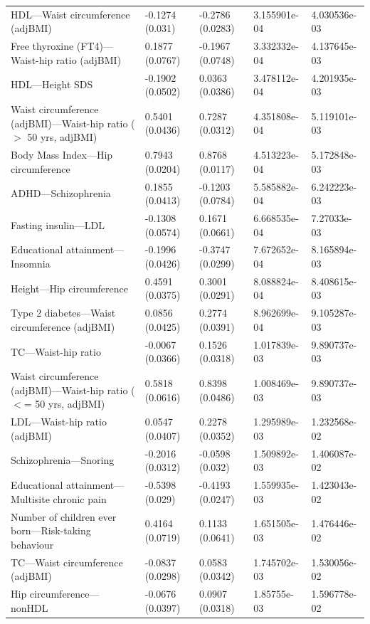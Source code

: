\documentclass{article}\usepackage[]{graphicx}\usepackage[dvipsnames]{xcolor}
\begin{document}
\begin{longtable}{p{6cm}|p{1.5cm}|p{1.5cm}|p{1.5cm}}
  HDL---Waist circumference (adjBMI) & -0.1274 (0.031) & -0.2786 (0.0283) & 3.155901e-04 & 4.030536e-03 \\ 
  Free thyroxine (FT4)---Waist-hip ratio (adjBMI) & 0.1877 (0.0767) & -0.1967 (0.0748) & 3.332332e-04 & 4.137645e-03 \\ 
  HDL---Height SDS & -0.1902 (0.0502) & 0.0363 (0.0386) & 3.478112e-04 & 4.201935e-03 \\ 
  Waist circumference (adjBMI)---Waist-hip ratio ($>$ 50 yrs, adjBMI) & 0.5401 (0.0436) & 0.7287 (0.0312) & 4.351808e-04 & 5.119101e-03 \\ 
  Body Mass Index---Hip circumference & 0.7943 (0.0204) & 0.8768 (0.0117) & 4.513223e-04 & 5.172848e-03 \\ 
  ADHD---Schizophrenia & 0.1855 (0.0413) & -0.1203 (0.0784) & 5.585882e-04 & 6.242223e-03 \\ 
  Fasting insulin---LDL & -0.1308 (0.0574) & 0.1671 (0.0661) & 6.668535e-04 & 7.27033e-03 \\ 
  Educational attainment---Insomnia & -0.1996 (0.0426) & -0.3747 (0.0299) & 7.672652e-04 & 8.165894e-03 \\ 
  Height---Hip circumference & 0.4591 (0.0375) & 0.3001 (0.0291) & 8.088824e-04 & 8.408615e-03 \\ 
  Type 2 diabetes---Waist circumference (adjBMI) & 0.0856 (0.0425) & 0.2774 (0.0391) & 8.962699e-04 & 9.105287e-03 \\ 
  TC---Waist-hip ratio & -0.0067 (0.0366) & 0.1526 (0.0318) & 1.017839e-03 & 9.890737e-03 \\ 
  Waist circumference (adjBMI)---Waist-hip ratio ($<$= 50 yrs, adjBMI) & 0.5818 (0.0616) & 0.8398 (0.0486) & 1.008469e-03 & 9.890737e-03 \\ 
  LDL---Waist-hip ratio (adjBMI) & 0.0547 (0.0407) & 0.2278 (0.0352) & 1.295989e-03 & 1.232568e-02 \\ 
  Schizophrenia---Snoring & -0.2016 (0.0312) & -0.0598 (0.032) & 1.509892e-03 & 1.406087e-02 \\ 
  Educational attainment---Multisite chronic pain & -0.5398 (0.029) & -0.4193 (0.0247) & 1.559935e-03 & 1.423043e-02 \\ 
  Number of children ever born---Risk-taking behaviour & 0.4164 (0.0719) & 0.1133 (0.0641) & 1.651505e-03 & 1.476446e-02 \\ 
  TC---Waist circumference (adjBMI) & -0.0837 (0.0298) & 0.0583 (0.0342) & 1.745702e-03 & 1.530056e-02 \\ 
  Hip circumference---nonHDL & -0.0676 (0.0397) & 0.0907 (0.0318) & 1.85755e-03 & 1.596778e-02 \\ 

\end{longtable}
\end{document}
